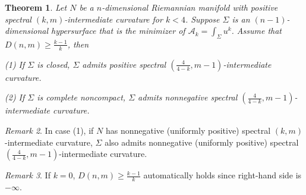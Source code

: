 \documentclass[11pt,letterpaper]{amsart}
\newcommand{\mA}{\mathcal{A}}
\newtheorem{theorem}{Theorem}[section]
\theoremstyle{definition}
\theoremstyle{remark}
\newtheorem{remark}[theorem]{Remark}
\numberwithin{equation}{section}
\begin{document}
\begin{theorem}\label{spectral inheritance}
    Let $N$ be a $n$-dimensional Riemannian manifold with positive spectral $(k,m)$-intermediate curvature for $k<4$. Suppose $\Sigma$ is an $(n-1)$-dimensional hypersurface that is the minimizer of $\mA_{k}=\int_\Sigma u^k$. Assume that $D(n,m)\geq \frac{k-1}{k}$, then
    
        (1) If $\Sigma$ is closed,  $\Sigma$ admits positive spectral $(\frac{4}{4-k},m-1)$-intermediate curvature.
        
        (2) If $\Sigma$ is complete noncompact, $\Sigma $ admits nonnegative spectral $(\frac{4}{4-k},m-1)$-intermediate curvature.

    
\end{theorem}
\begin{remark}
    In case (1), if $N$ has nonnegative (uniformly positive) spectral $(k,m)$-intermediate curvature, $\Sigma$ also admits nonnegative (uniformly positive) spectral $(\frac{4}{4-k},m-1)$-intermediate curvature.
\end{remark}
\begin{remark}
    If $k=0$, $D(n,m)\geq \frac{k-1}{k}$ automatically holds since right-hand side is $-\infty$.
\end{remark}
\end{document}
